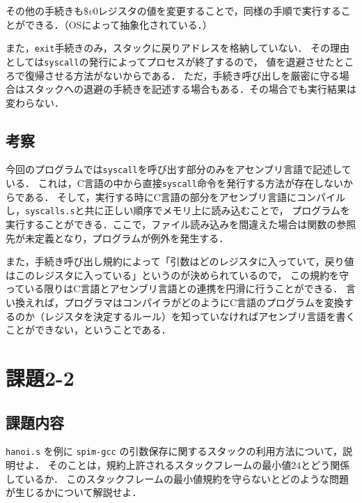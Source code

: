 \documentclass[a4j,11pt]{jarticle}
\begin{document}
その他の手続きも$\$v0$レジスタの値を変更することで，同様の手順で実行することができる．（OSによって抽象化されている．）

また，{\tt exit}手続きのみ，スタックに戻りアドレスを格納していない．
その理由としては{\tt syscall}の発行によってプロセスが終了するので，
値を退避させたところで復帰させる方法がないからである．
ただ，手続き呼び出しを厳密に守る場合はスタックへの退避の手続きを記述する場合もある．その場合でも実行結果は変わらない．

\subsection{考察}

今回のプログラムでは{\tt syscall}を呼び出す部分のみをアセンブリ言語で記述している．
これは，C言語の中から直接{\tt syscall}命令を発行する方法が存在しないからである．
そして，実行する時にC言語の部分をアセンブリ言語にコンパイルし，{\tt syscalls.s}と共に正しい順序でメモリ上に読み込むことで，
プログラムを実行することができる．ここで，ファイル読み込みを間違えた場合は関数の参照先が未定義となり，プログラムが例外を発生する．

また，手続き呼び出し規約によって「引数はどのレジスタに入っていて，戻り値はこのレジスタに入っている」というのが決められているので，
この規約を守っている限りはC言語とアセンブリ言語との連携を円滑に行うことができる．
言い換えれば，プログラマはコンパイラがどのようにC言語のプログラムを変換するのか（レジスタを決定するルール）を知っていなければアセンブリ言語を書くことができない，ということである．

\section{課題2-2}
\subsection{課題内容}
{\tt hanoi.s} を例に {\tt spim-gcc} の引数保存に関するスタックの利用方法について，説明せよ． 
そのことは，規約上許されるスタックフレームの最小値$24$とどう関係しているか． 
このスタックフレームの最小値規約を守らないとどのような問題が生じるかについて解説せよ．
\end{document}
